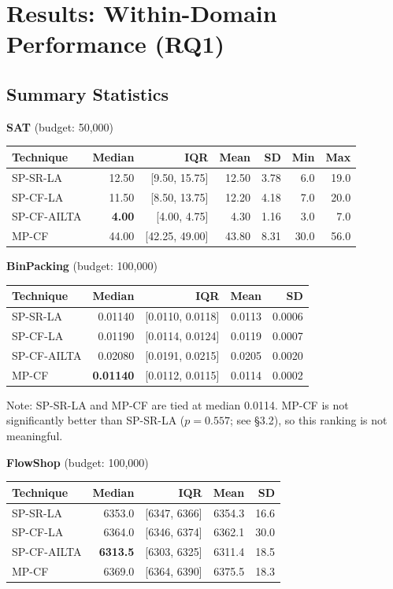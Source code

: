 \documentclass[11pt,a4paper]{article}
\begin{document}
\section{Results: Within-Domain Performance (RQ1)}

\subsection{Summary Statistics}

\textbf{SAT} (budget: 50{,}000)

\begin{table}[H]
\centering
\small
\begin{tabular}{lrrrrrr}
\toprule
Technique & Median & IQR & Mean & SD & Min & Max \\
\midrule
SP-SR-LA & 12.50 & [9.50, 15.75] & 12.50 & 3.78 & 6.0 & 19.0 \\
SP-CF-LA & 11.50 & [8.50, 13.75] & 12.20 & 4.18 & 7.0 & 20.0 \\
SP-CF-AILTA & \textbf{4.00} & [4.00, 4.75] & 4.30 & 1.16 & 3.0 & 7.0 \\
MP-CF & 44.00 & [42.25, 49.00] & 43.80 & 8.31 & 30.0 & 56.0 \\
\bottomrule
\end{tabular}
\end{table}

\textbf{BinPacking} (budget: 100{,}000)

\begin{table}[H]
\centering
\small
\begin{tabular}{lrrrr}
\toprule
Technique & Median & IQR & Mean & SD \\
\midrule
SP-SR-LA & 0.01140 & [0.0110, 0.0118] & 0.0113 & 0.0006 \\
SP-CF-LA & 0.01190 & [0.0114, 0.0124] & 0.0119 & 0.0007 \\
SP-CF-AILTA & 0.02080 & [0.0191, 0.0215] & 0.0205 & 0.0020 \\
MP-CF & \textbf{0.01140} & [0.0112, 0.0115] & 0.0114 & 0.0002 \\
\bottomrule
\end{tabular}
\end{table}

Note: SP-SR-LA and MP-CF are tied at median 0.0114. MP-CF is not significantly
better than SP-SR-LA ($p = 0.557$; see \S3.2), so this ranking is not meaningful.

\textbf{FlowShop} (budget: 100{,}000)

\begin{table}[H]
\centering
\small
\begin{tabular}{lrrrr}
\toprule
Technique & Median & IQR & Mean & SD \\
\midrule
SP-SR-LA & 6353.0 & [6347, 6366] & 6354.3 & 16.6 \\
SP-CF-LA & 6364.0 & [6346, 6374] & 6362.1 & 30.0 \\
SP-CF-AILTA & \textbf{6313.5} & [6303, 6325] & 6311.4 & 18.5 \\
MP-CF & 6369.0 & [6364, 6390] & 6375.5 & 18.3 \\
\bottomrule
\end{tabular}
\end{table}
\end{document}
